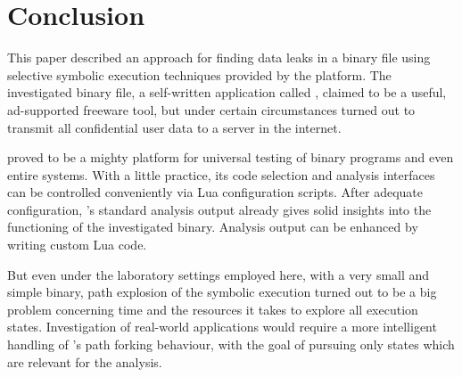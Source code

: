 \section{Conclusion}\label{sec:conclusion}

This paper described an approach for finding data leaks in a binary file using selective symbolic execution techniques provided by the \sse platform.
The investigated binary file, a self-written application called \app, claimed to be a useful, ad-supported freeware tool, but under certain circumstances turned out to transmit all confidential user data to a server in the internet.

\sse proved to be a mighty platform for universal testing of binary programs and even entire systems.
With a little practice, its code selection and analysis interfaces can be controlled conveniently via Lua configuration scripts.
After adequate configuration, \sse's standard analysis output already gives solid insights into the functioning of the investigated binary. Analysis output can be enhanced by writing custom Lua code.

But even under the laboratory settings employed here, with a very small and simple binary, path explosion of the symbolic execution turned out to be a big problem concerning time and the resources it takes to explore all execution states.
Investigation of real-world applications would require a more intelligent handling of \sse's path forking behaviour, with the goal of pursuing only states which are relevant for the analysis.



\iffalse
§9	Conclusion
		> Zusammenfassung: was habe ich gemacht?
		> Fazit: war die Sache sinnvoll und erfolgreich?
\fi